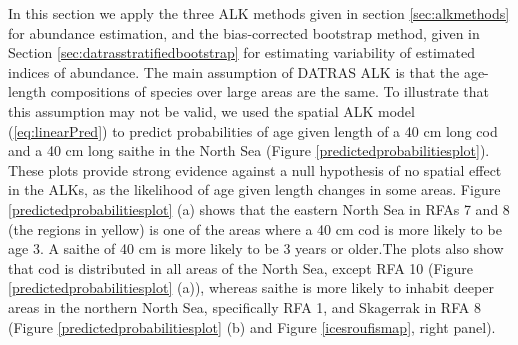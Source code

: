 \documentclass[a4paper 12pt]{article}
\numberwithin{equation}{section}
\begin{document}
In this section we apply the three ALK methods given in section \ref{sec:alkmethods} for abundance estimation, and the bias-corrected bootstrap method, given in Section \ref{sec:datrasstratifiedbootstrap} for estimating variability of estimated indices of abundance. The main assumption of DATRAS ALK is that the age-length compositions of species over large areas are the same. To illustrate that this assumption may not be valid, we used  the spatial ALK model (\ref{eq:linearPred}) to predict probabilities of age given length of a 40 cm long cod and a 40 cm long saithe in the North Sea (Figure \ref{predictedprobabilitiesplot}). These plots provide strong evidence against a null hypothesis of no spatial effect in the ALKs, as the likelihood of age given length changes in some areas. Figure \ref{predictedprobabilitiesplot} (a) shows that the eastern North Sea in RFAs 7 and 8 (the regions in yellow) is one of the areas where a 40 cm cod is more likely to be age 3. A saithe of 40 cm is more likely to be 3 years or older.The plots also show that cod is distributed in all areas of the North Sea, except RFA 10 (Figure \ref{predictedprobabilitiesplot} (a)), whereas saithe is more likely to inhabit deeper areas in the northern North Sea, specifically RFA 1, and Skagerrak in  RFA 8 (Figure \ref{predictedprobabilitiesplot} (b) and Figure \ref{icesroufismap}, right panel). 

\end{document}
